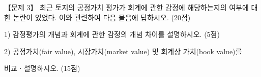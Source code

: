 \begin{longquestion}{【문제 3】}
최근 토지의 공정가치 평가가 회계에 관한 감정에 해당하는지의 여부에 대한 논란이 있었다. 이와 관련하여 다음 물음에 답하시오. (20점) \par
1) 감정평가의 개념과 회계에 관한 감정의 개념 차이를 설명하시오. (5점) \par
2) 공정가치(fair value), 시장가치(market value) 및 회계상 가치(book value)를 \par
비교ㆍ설명하시오. (15점) \par
\end{longquestion}
